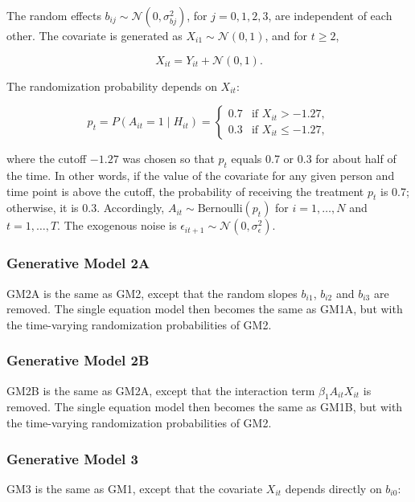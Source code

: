\documentclass[
  12pt,
  a4paper,
]{article}
\begin{document}
The random effects \(b_{ij} \sim \mathcal{N}(0, \sigma_{bj}^2)\), for
\(j = 0, 1, 2, 3\), are independent of each other. The covariate is
generated as \(X_{i1} \sim \mathcal{N}(0, 1)\), and for \(t \geq 2\),

\[
X_{it} = Y_{it} + \mathcal{N}(0, 1).
\]

The randomization probability depends on \(X_{it}\):

\[
p_t = P(A_{it} = 1 \mid H_{it}) = 
\begin{cases} 
0.7 & \text{if } X_{it} > -1.27, \\
0.3 & \text{if } X_{it} \leq -1.27,
\end{cases}
\]

where the cutoff \(-1.27\) was chosen so that \(p_t\) equals 0.7 or 0.3
for about half of the time. In other words, if the value of the
covariate for any given person and time point is above the cutoff, the
probability of receiving the treatment \(p_t\) is 0.7; otherwise, it is
0.3. Accordingly, \(A_{it} \sim \text{Bernoulli}(p_t)\) for
\(i = 1, \ldots, N\) and \(t = 1, \ldots, T\). The exogenous noise is
\(\epsilon_{it+1} \sim \mathcal{N}(0, \sigma_\epsilon^2)\).

\subsubsection{Generative Model 2A}\label{generative-model-2a}

GM2A is the same as GM2, except that the random slopes \(b_{i1}\),
\(b_{i2}\) and \(b_{i3}\) are removed. The single equation model then
becomes the same as GM1A, but with the time-varying randomization
probabilities of GM2.

\subsubsection{Generative Model 2B}\label{generative-model-2b}

GM2B is the same as GM2A, except that the interaction term
\(\beta_1 A_{it} X_{it}\) is removed. The single equation model then
becomes the same as GM1B, but with the time-varying randomization
probabilities of GM2.

\subsubsection{Generative Model 3}\label{generative-model-3}

GM3 is the same as GM1, except that the covariate \(X_{it}\) depends
directly on \(b_{i0}\):
\end{document}
